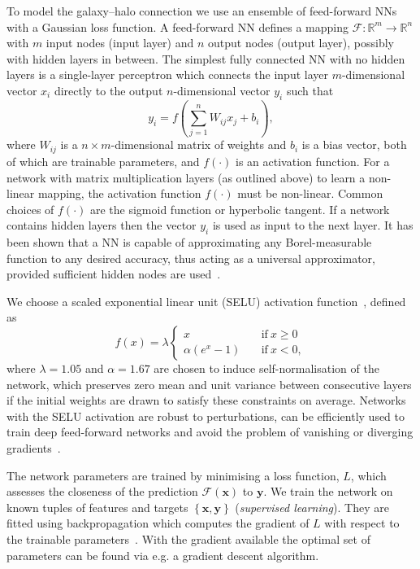 \documentclass[useAMS,usenatbib]{mnras}
\begin{document}
To model the galaxy--halo connection we use an ensemble of feed-forward \acp{NN} with a Gaussian loss function. A feed-forward NN defines a mapping $\mathcal{F}: \mathbb{R}^m \rightarrow \mathbb{R}^n$ with $m$ input nodes (input layer) and $n$ output nodes (output layer), possibly with hidden layers in between. The simplest fully connected NN with no hidden layers is a single-layer perceptron which connects the input layer $m$-dimensional vector $x_i$ directly to the output $n$-dimensional vector $y_i$ such that
\begin{equation}
	y_i = f\left(\sum_{j=1}^{n} W_{ij} x_j + b_i\right),
\end{equation}
where $W_{ij}$ is a $n\times m$-dimensional matrix of weights and $b_i$ is a bias vector, both of which are trainable parameters, and $f(\cdot)$ is an activation function. For a network with matrix multiplication layers (as outlined above) to learn a non-linear mapping, the activation function $f(\cdot)$ must be non-linear. Common choices of $f(\cdot)$ are the sigmoid function or hyperbolic tangent. If a network contains hidden layers then the vector $y_i$ is  used as input to the next layer. It has been shown that a NN is capable of approximating any Borel-measurable function to any desired accuracy, thus acting as a universal approximator, provided sufficient hidden nodes are used~\citep{Hornik_universal_approximator}.

We choose a scaled exponential linear unit (SELU) activation function~\citep{Klambauer_SELU}, defined as
\begin{equation}
    f(x) = \lambda
    \begin{cases}
        x &\quad \mathrm{if}~ x \geq 0\\
        \alpha \left(e^x - 1\right) &\quad \mathrm{if}~ x < 0,
    \end{cases}
\end{equation}
where $\lambda = 1.05$ and $\alpha = 1.67$ are chosen to induce self-normalisation of the network, which preserves zero mean and unit variance between consecutive layers if the initial weights are drawn to satisfy these constraints on average. Networks with the SELU activation are robust to perturbations, can be efficiently used to train deep feed-forward networks and avoid the problem of vanishing or diverging gradients~\citep{Klambauer_SELU}.

The network parameters are trained by minimising a loss function, $L$, which assesses the closeness of the prediction $\mathcal{F}(\bm{x})$ to $\bm{y}$. We train the network on known tuples of features and targets $\left\{\bm{x}, \bm{y}\right\}$ (\emph{supervised learning}). They are fitted using backpropagation which computes the gradient of $L$ with respect to the trainable parameters~\citep{Rumelhart_backprop}. With the gradient available the optimal set of parameters can be found via e.g. a gradient descent algorithm.
\end{document}
